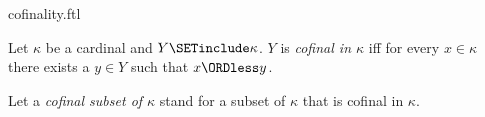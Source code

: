 \documentclass{naproche-library}
\begin{document}
\begin{smodule}[title=Cofinality]{cofinality.ftl}

\begin{definition}[forthel,id=SET_THEORY_06_5621203645212879]
  Let $\kappa$ be a cardinal and $Y \SETinclude \kappa$.
  $Y$ is \emph{cofinal in $\kappa$} iff for every $x \in \kappa$ there exists a $y \in Y$ such that $x \ORDless y$.

  Let a \emph{cofinal subset of $\kappa$} stand for a subset of $\kappa$ that is cofinal in $\kappa$.
\end{definition}
\end{smodule}
\end{document}
